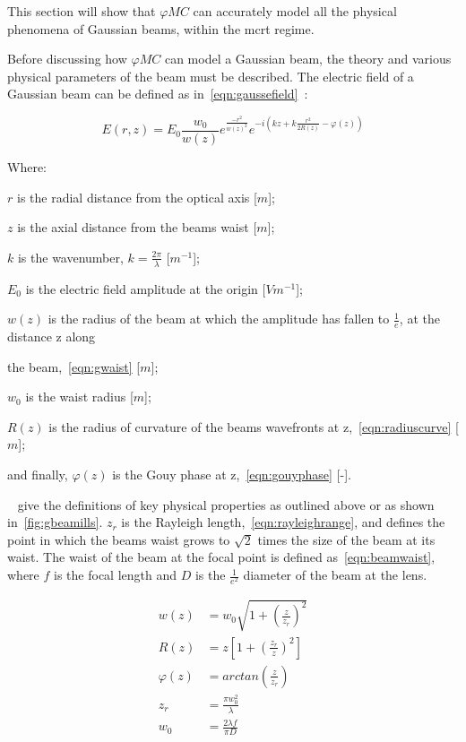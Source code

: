 This section will show that $\varphi MC$ can accurately model all the physical phenomena of Gaussian beams, within the \gls*{mcrt} regime.

Before discussing how $\varphi MC$ can model a Gaussian beam, the theory and various physical parameters of the beam must be described. 
The electric field of a Gaussian beam can be defined as in~\cref{eqn:gaussefield}~\cite{milonni2010laser}:

\begin{equation}
E(r,z)=E_0\frac{w_0}{w(z)}e^{\frac{-r^2}{w(z)^2}}e^{-i(kz+k\frac{r^2}{2R(z)}-\varphi(z))}
\label{eqn:gaussefield}
\end{equation}

\noindent Where:

    \indent $r$ is the radial distance from the optical axis [$m$];

    \indent $z$ is the axial distance from  the beams waist [$m$];

    \indent $k$ is the wavenumber, $k=\frac{2\pi}{\lambda}$ [$m^{-1}$];

    \indent $E_0$ is the electric field amplitude at the origin [$Vm^{-1}$];

    \indent $w(z)$ is the radius of the beam at which the amplitude has fallen to $\frac{1}{e}$, at the distance z along 

    \indent the beam,~\cref{eqn:gwaist} [$m$];

    \indent $w_0$ is the waist radius [$m$];

    \indent $R(z)$ is the radius of curvature of the beams wavefronts at z,~\cref{eqn:radiuscurve} [$m$];

    \indent and finally, $\varphi(z)$ is the Gouy phase at z,~\cref{eqn:gouyphase} [-].

\medskip

~ give the definitions of key physical properties as outlined above or as shown in~\cref{fig:gbeamills}. 
$z_r$ is the Rayleigh length,~\cref{eqn:rayleighrange}, and defines the point in which the beams waist grows to $\sqrt{2}$ times the size of the beam at its waist.
The waist of the beam at the focal point is defined as~\cref{eqn:beamwaist}, where $f$ is the focal length and $D$ is the $\tfrac{1}{e^2}$ diameter of the beam at the lens.

\begin{align}
    w(z) &= w_0\sqrt{1+\left(\frac{z}{z_r}\right)^2} \label{eqn:gwaist} \\
    R(z) &= z\left[1+\left(\frac{z_r}{z}\right)^2\right]\label{eqn:radiuscurve}\\
    \varphi(z) &= arctan\left(\frac{z}{z_r}\right)\label{eqn:gouyphase}\\
    z_r &= \frac{\pi w_0^2}{\lambda}\label{eqn:rayleighrange}\\
    w_0 &= \frac{2\lambda f}{\pi D}\label{eqn:beamwaist}\\
\end{align}

